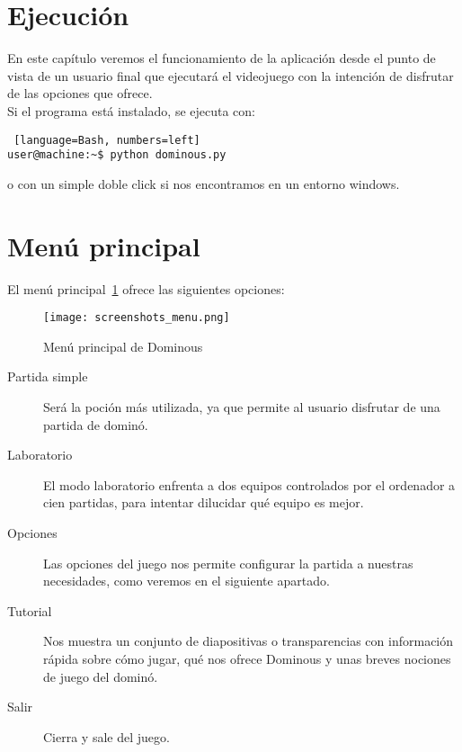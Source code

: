 



\section{Ejecución}

En este capítulo veremos el funcionamiento de la aplicación desde el punto de vista de un usuario final que ejecutará el
videojuego con la intención de disfrutar de las opciones que ofrece. \\

Si el programa está instalado, se ejecuta con:

\begin{lstlisting} [language=Bash, numbers=left]
user@machine:~$ python dominous.py
\end{lstlisting}

o con un simple doble click si nos encontramos en un entorno windows. \\


\section{Menú principal}

El menú principal~\ref{fig:screenshots_menu} ofrece las siguientes opciones:

\begin{figure}[h]
  \label{fig:screenshots_menu}
  \begin{center}
    \texttt{[image: screenshots\_menu.png]}
  \end{center}
  \caption{Menú principal de Dominous}
\end{figure}

\begin{description}
    \item[Partida simple] Será la poción más utilizada, ya que permite al usuario disfrutar de una partida de dominó.
    \item[Laboratorio] El modo laboratorio enfrenta a dos equipos controlados por el ordenador a cien partidas, para
            intentar dilucidar qué equipo es mejor.
    \item[Opciones] Las opciones del juego nos permite configurar la partida a nuestras necesidades, como veremos en el
            siguiente apartado.
    \item[Tutorial] Nos muestra un conjunto de diapositivas o transparencias con información rápida sobre cómo jugar,
            qué nos ofrece Dominous y unas breves nociones de juego del dominó.
    \item[Salir] Cierra y sale del juego.
\end{description}

